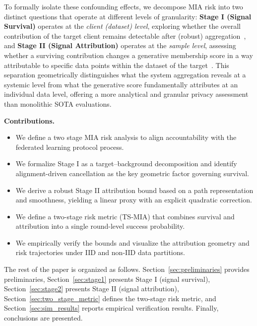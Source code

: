 \documentclass[bdcc,article,submit,pdftex]{Definitions/mdpi}
\renewcommand{\paragraph}[1]{\medskip\noindent\textbf{#1}\par\nobreak}
\begin{document}
To formally isolate these confounding effects, we decompose MIA risk into two distinct questions that operate at different levels of granularity:
\textbf{Stage I (Signal Survival)} operates at the \emph{client (dataset) level}, exploring whether the overall contribution of the target client remains detectable after (robust) aggregation~\cite{zhu2019deep,geiping2020inverting}, and
\textbf{Stage II (Signal Attribution)} operates at the \emph{sample level}, assessing whether a surviving contribution changes a generative membership score in a way attributable to specific data points within the dataset of the target~\cite{Galende2025Membership,carlini2022membership}.
This separation geometrically distinguishes what the system aggregation reveals at a systemic level from what the generative score fundamentally attributes at an individual data level, offering a more analytical and granular privacy assessment than monolithic SOTA evaluations.

\paragraph{Contributions.}
\begin{itemize}[leftmargin=1.5em]
    \item We define a two stage MIA risk analysis to align accountability with the federated learning protocol process.
    \item We formalize Stage I as a target--background decomposition and identify alignment-driven cancellation as the key geometric factor governing survival.
    \item We derive a robust Stage II attribution bound based on a path representation and smoothness, yielding a linear proxy with an explicit quadratic correction.
    \item We define a two-stage risk metric (TS-MIA) that combines survival and attribution into a single round-level success probability.
    \item We empirically verify the bounds and visualize the attribution geometry and risk trajectories under IID and non-IID data partitions.
\end{itemize}

The rest of the paper is organized as follows. Section~\ref{sec:preliminaries} provides preliminaries, Section~\ref{sec:stage1} presents Stage I (signal survival), Section~\ref{sec:stage2} presents Stage II (signal attribution),
Section~\ref{sec:two_stage_metric} defines the two-stage risk metric, and Section~\ref{sec:sim_results} reports empirical verification results.
Finally, conclusions are presented.
\end{document}
